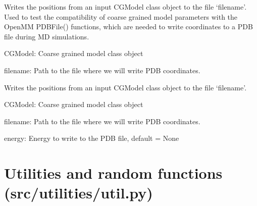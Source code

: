 \documentclass[letterpaper,12pt,english,openany,oneside]{sphinxmanual}
\begin{document}

\begin{fulllineitems}
\label{\detokenize{utilities:utilities.iotools.write_cg_pdb}}
Writes the positions from an input CGModel class object to the file ‘filename’.  Used to test the compatibility of coarse grained model parameters with the OpenMM PDBFile() functions, which are needed to write coordinates to a PDB file during MD simulations.

CGModel: Coarse grained model class object

filename: Path to the file where we will write PDB coordinates.

\end{fulllineitems}


\begin{fulllineitems}
\label{\detokenize{utilities:utilities.iotools.write_pdbfile_without_topology}}
Writes the positions from an input CGModel class object to the file ‘filename’.

CGModel: Coarse grained model class object

filename: Path to the file where we will write PDB coordinates.

energy: Energy to write to the PDB file, default = None

\end{fulllineitems}



\section{Utilities and random functions (src/utilities/util.py)}
\label{\detokenize{utilities:module-utilities.util}}\label{\detokenize{utilities:utilities-and-random-functions-src-utilities-util-py}}
\end{document}

